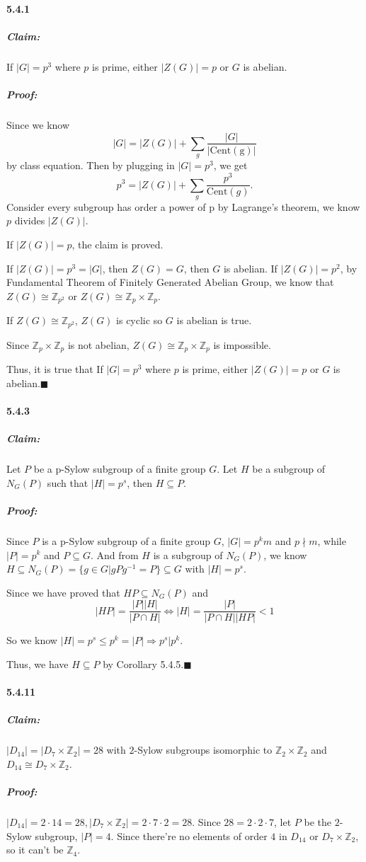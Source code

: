 \documentclass[11pt]{article}
\begin{document}
	\paragraph{5.4.1}
		\subparagraph{Claim:} If $|G| = p^3$ where $p$ is prime, either $|Z(G)| = p$ or $G$ is abelian.
		\subparagraph{Proof:}
			Since we know
				\[|G| = |Z(G)| + \sum_g \frac{|G|}{|\mathrm{Cent(g)}|}\]
			by class equation. Then by plugging in $|G| = p^3$, we get 
				\[p^3 = |Z(G)| + \sum_g \frac{p^3}{\mathrm{Cent}(g)}.\] 
			Consider every subgroup has order a power of p by Lagrange’s theorem, we know $p$ divides $|Z(G)|$.
			
			If $|Z(G)| = p$, the claim is proved.
			
			If $|Z(G)| = p^3 = |G|$, then $Z(G) = G$, then $G$ is abelian.
			If $|Z(G)| = p^2$, by Fundamental Theorem of Finitely Generated Abelian Group, we know that $Z(G) \cong \mathbb{Z}_{p^2}$ or $Z(G) \cong \mathbb{Z}_p \times \mathbb{Z}_p$.
			
			If $Z(G) \cong \mathbb{Z}_{p^2}$, $Z(G)$ is cyclic so $G$ is abelian is true.
			
			Since $\mathbb{Z}_p \times \mathbb{Z}_p$ is not abelian, $Z(G) \cong \mathbb{Z}_p \times \mathbb{Z}_p$ is impossible.
			
			Thus, it is true that If $|G| = p^3$ where $p$ is prime, either $|Z(G)| = p$ or $G$ is abelian.$\blacksquare$
	\paragraph{5.4.3}
		\subparagraph{Claim:} Let $P$ be a p-Sylow subgroup of a finite group $G$. Let $H$ be a subgroup of $N_G(P)$ such that $|H| = p^s$, then $H \subseteq P$.
		\subparagraph{Proof:} Since $P$ is a p-Sylow subgroup of a finite group $G$, $|G| = p^km$ and $p \nmid m$, while $|P| = p^k$ and $P \subseteq G$. And from $H$ is a subgroup of $N_G(P)$, we know $H \subseteq N_G(P) = \{g \in G | gPg^{-1} = P\} \subseteq G$ with $|H| = p^s$.	
		
		Since we have proved that $HP \subseteq N_G(P)$ and 
		\[|HP| = \frac{|P||H|}{|P \cap H|} \Leftrightarrow |H| = \frac{|P|}{|P \cap H||HP|} < 1\]
		
		So we know $|H| = p^s \leq p^k = |P| \Rightarrow p^s | p^k$.
		
		Thus, we have $H \subseteq P$ by Corollary 5.4.5.$\blacksquare$
			
	\paragraph{5.4.11}
		\subparagraph{Claim:} $|D_{14}| = |D_7 \times \mathbb{Z}_2| = 28$ with $2$-Sylow subgroups isomorphic to $\mathbb{Z}_2 \times \mathbb{Z}_2$ and $D_{14} \cong D_7 \times \mathbb{Z}_2$.
		\subparagraph{Proof:}
			$|D_{14}| = 2 \cdot 14 = 28, |D_7 \times \mathbb{Z}_2| = 2 \cdot 7 \cdot 2 = 28$. Since $28 = 2 \cdot 2 \cdot 7$, let $P$ be the $2$-Sylow subgroup, $|P| = 4$. Since there're no elements of order $4$ in $D_{14}$ or $D_7 \times \mathbb{Z}_2$, so it can't be $\mathbb{Z}_4$. 
			
\end{document}
